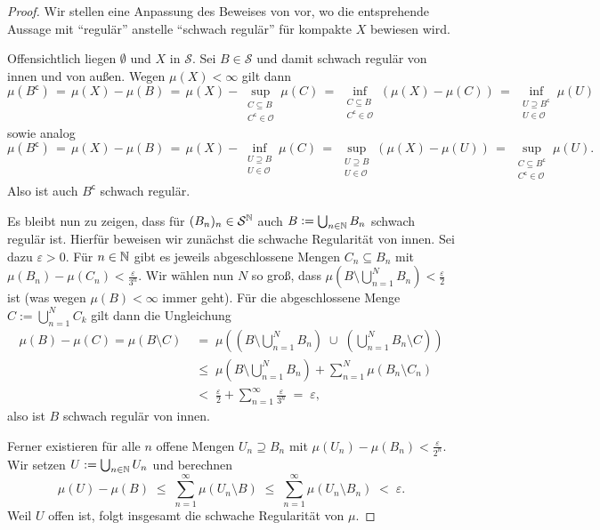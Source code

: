 \documentclass[../main/main.tex]{subfiles}
\begin{document}
	\begin{proof}
		Wir stellen eine Anpassung des Beweises von 
		\cite[Lemma 4.5.5]{Simon.2015} vor, wo die entsprehende Aussage mit \enquote{regulär} 
		anstelle \enquote{schwach regulär} für kompakte $X$ bewiesen wird.
		
		Offensichtlich liegen $\emptyset$ und $X$ in $\mathcal{S}$. Sei 
		$B \in \mathcal{S}$ und damit schwach regulär 
		von innen und von außen. Wegen $\mu(X) < \infty$ gilt dann
		$$\mu(B^\mathsf{c}) 
		\, = \, \mu(X) - \mu(B) 
		\, = \, \mu(X) - \sup_{\substack{C \subseteq B \\ C^\mathsf{c} \in \mathcal{O}}} \mu(C) 
		\, = \, \inf_{\substack{C \subseteq B \\ C^\mathsf{c} \in \mathcal{O}}} (\mu(X) - \mu(C))
		\, = \, \inf_{\substack{U \supseteq B^\mathsf{c} \\ U \in \mathcal{O}}} \mu(U)$$
		sowie analog
		$$\mu(B^\mathsf{c}) 
		\, = \, \mu(X) - \mu(B) 
		\, = \, \mu(X) - \inf_{\substack{U \supseteq B \\ U \in \mathcal{O}}} \mu(C)
		\, = \, \sup_{\substack{U \supseteq B \\ U \in \mathcal{O}}} (\mu(X) - \mu(U))
		\, = \, \sup_{\substack{C \subseteq B^\mathsf{c} \\ C^\mathsf{c} \in 
				\mathcal{O}}} \mu(U) \text{.}$$
		Also ist auch $B^\mathsf{c}$ schwach regulär. 
		
		Es bleibt nun zu zeigen, dass für $(B_n)_n \in \mathcal{S}^{\mathbb{N}}$ auch $B \vcentcolon = 
		\bigcup_{n \in \mathbb{N}} B_n$ schwach regulär ist. 
		Hierfür beweisen wir zunächst die schwache Regularität von innen. 
		Sei dazu $\varepsilon > 0$. Für $n \in \mathbb{N}$ gibt es jeweils abgeschlossene Mengen 
		$C_n \subseteq B_n$ mit $\mu(B_n) - \mu(C_n) < \frac{\varepsilon}{3^n}$.
		Wir wählen nun $N$ so groß, dass $\mu\left( B \setminus \bigcup_{n=1}^N B_n \right) 
		< \frac{\varepsilon}{2}$ ist (was wegen $\mu(B) < \infty$ immer geht). 
		Für die abgeschlossene Menge $C := \bigcup_{n=1}^N C_k$ gilt dann die Ungleichung 
		\begin{align*}
			\mu(B) - \mu(C) = \mu(B\setminus C) \; &=
			\; \mu\left( \left( B \setminus \bigcup_{n=1}^N B_n \right) \; \cup \; 
			\left( \bigcup_{n=1}^N B_n  \setminus C \right) \right) \\
			&\leq \; \mu \left( B \setminus \bigcup_{n=1}^N B_n \right) + 
			\sum_{n=1}^{N} \mu(B_n \setminus C_n) \\
			&<    \; \frac{\varepsilon}{2} + 
			\sum_{n=1}^{\infty} \frac{\varepsilon}{3^n} \; = \; \varepsilon \text{,}
		\end{align*}
		also ist $B$ schwach regulär von innen.
		
		Ferner existieren für alle $n$ offene Mengen $U_n \supseteq B_n$ 
		mit $\mu(U_n) - \mu(B_n) < \frac{\varepsilon}{2^n}$. Wir setzen 
		$U := \bigcup_{n \in \mathbb{N}} U_n$ und berechnen  
		$$\mu(U) - \mu(B) \; \leq \; \sum_{n=1}^\infty \mu(U_n \setminus B) \; \leq \; 
		\sum_{n=1}^\infty \mu(U_n \setminus B_n) \; < \; \varepsilon \text{.}$$
		Weil $U$ offen ist, folgt insgesamt die schwache Regularität von $\mu$.
	\end{proof}
	
\end{document}
